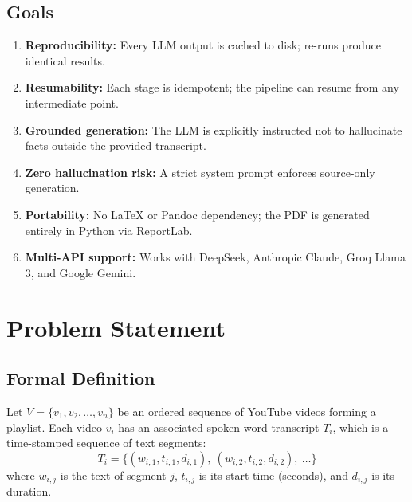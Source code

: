 \documentclass[11pt,a4paper]{article}
\begin{document}
\subsection{Goals}

\begin{enumerate}[leftmargin=1.5em]
    \item \textbf{Reproducibility:} Every LLM output is cached to disk; re-runs produce identical results.
    \item \textbf{Resumability:} Each stage is idempotent; the pipeline can resume from any intermediate point.
    \item \textbf{Grounded generation:} The LLM is explicitly instructed not to hallucinate facts outside the provided transcript.
    \item \textbf{Zero hallucination risk:} A strict system prompt enforces source-only generation.
    \item \textbf{Portability:} No LaTeX or Pandoc dependency; the PDF is generated entirely in Python via ReportLab.
    \item \textbf{Multi-API support:} Works with DeepSeek, Anthropic Claude, Groq Llama 3, and Google Gemini.
\end{enumerate}

\section{Problem Statement}

\subsection{Formal Definition}

Let $V = \{v_1, v_2, \ldots, v_n\}$ be an ordered sequence of YouTube videos forming a playlist. Each video $v_i$ has an associated spoken-word transcript $T_i$, which is a time-stamped sequence of text segments:
\[
T_i = \{(w_{i,1}, t_{i,1}, d_{i,1}),\ (w_{i,2}, t_{i,2}, d_{i,2}),\ \ldots\}
\]
where $w_{i,j}$ is the text of segment $j$, $t_{i,j}$ is its start time (seconds), and $d_{i,j}$ is its duration.
\end{document}
